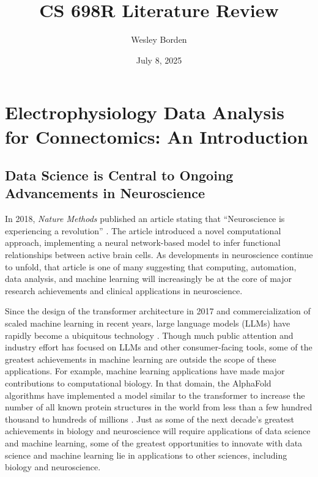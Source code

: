 \documentclass[11pt]{article}
\title{CS 698R Literature Review}
\author{Wesley Borden}
\date{July 8, 2025}
\newcommand{\sectionwithindent}[1]{
    \section*{#1}
    \hspace{\parindent} %
}
\newcommand{\subsectionwithindent}[1]{
    \subsection*{#1}
    \hspace{\parindent} %
}
\begin{document}
\sectionwithindent{Electrophysiology Data Analysis for Connectomics: An Introduction}

\vspace{-2em}

\subsectionwithindent{Data Science is Central to Ongoing Advancements in Neuroscience}
In 2018, \textit{Nature Methods} published an article stating that ``Neuroscience is experiencing a revolution'' \cite{pandarinath2018autoencoders}. The article introduced a novel computational approach, implementing a neural network-based model to infer functional relationships between active brain cells. As developments in neuroscience continue to unfold, that article is one of many suggesting that computing, automation, data analysis, and machine learning will increasingly be at the core of major research achievements and clinical applications in neuroscience.

Since the design of the transformer architecture in 2017 \cite{vaswani2023attentionneed} and commercialization of scaled machine learning in recent years, large language models (LLMs) have rapidly become a ubiquitous technology \cite{naveed2025llm}. Though much public attention and industry effort has focused on LLMs and other consumer-facing tools, some of the greatest achievements in machine learning are outside the scope of these applications. For example, machine learning applications have made major contributions to computational biology. In that domain, the AlphaFold algorithms have implemented a model similar to the transformer to increase the number of all known protein structures in the world from less than a few hundred thousand to hundreds of millions \cite{jumper2021alphafold, varadi2024alphafolddb}. Just as some of the next decade's greatest achievements in biology and neuroscience will require applications of data science and machine learning, some of the greatest opportunities to innovate with data science and machine learning lie in applications to other sciences, including biology and neuroscience.
\end{document}
